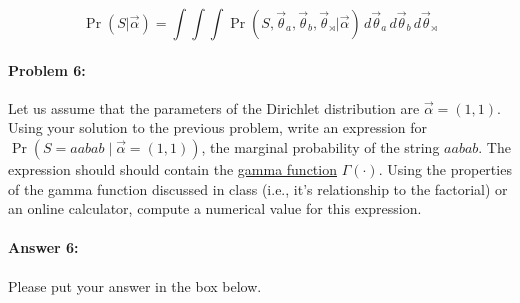\documentclass[10pt]{article}
\newenvironment{AnswerBox}{\begin{mdframed}[style=simple]}{\end{mdframed}}
\begin{document}
\begin{AnswerBox}%

    \[
    \Pr(S|\vec{\alpha}) = \int \int \int \Pr(S, \vec{\theta}_a, \vec{\theta}_b, \vec{\theta}_\rtimes | \vec{\alpha}) \, d\vec{\theta}_a \, d\vec{\theta}_b \, d\vec{\theta}_\rtimes
    \]

    
\end{AnswerBox}%


\hrulefill %

\paragraph{Problem 6:}


Let us assume that the parameters of the Dirichlet distribution are
$\vec{\alpha} = (1,1)$. Using your solution to the previous problem,
write an expression for $\Pr(S=aabab\mid \vec \alpha = (1,1))$,
the marginal probability of the string $aabab$.
The expression should should contain the
\href{https://en.wikipedia.org/wiki/Gamma_function}{gamma function}
$\Gamma(\cdot)$. Using the properties of the gamma function discussed
in class (i.e., it's relationship to the factorial) or an online
calculator, compute a numerical value for this expression.



\paragraph{Answer 6:} Please put your answer in the box below.
\end{document}
